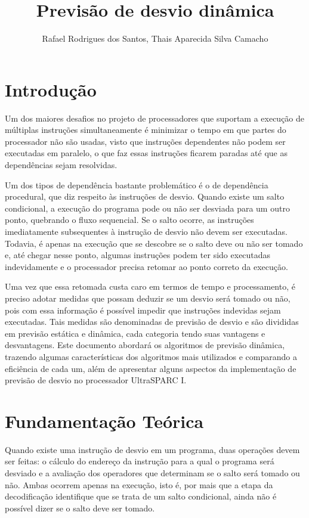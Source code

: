 \documentclass[12pt]{article}
\title{Previsão de desvio dinâmica}
\author{Rafael Rodrigues dos Santos\inst{1}, Thais Aparecida Silva Camacho\inst{1}}
\begin{document}
\maketitle

\section{Introdução}

Um dos maiores desafios no projeto de processadores que suportam a execução de múltiplas instruções simultaneamente é minimizar o tempo em que partes do
processador não são usadas, visto que instruções dependentes não podem ser executadas em paralelo, o que faz essas instruções ficarem paradas até que as
dependências sejam resolvidas.

Um dos tipos de dependência bastante problemático é o de dependência procedural, que diz respeito às instruções de desvio. Quando existe um salto condicional, a
execução do programa pode ou não ser desviada para um outro ponto, quebrando o fluxo sequencial. Se o salto ocorre, as instruções imediatamente subsequentes à
instrução de desvio não devem ser executadas. Todavia, é apenas na execução que se descobre se o salto deve ou não ser tomado e, até chegar nesse ponto,
algumas instruções podem ter sido executadas indevidamente e o processador precisa retomar ao ponto correto da execução.

Uma vez que essa retomada custa caro em termos de tempo e processamento, é preciso adotar medidas que possam deduzir se um desvio será tomado ou não, pois com
essa informação é possível impedir que instruções indevidas sejam executadas. Tais medidas são denominadas de previsão de desvio e são divididas em previsão
estática e dinâmica, cada categoria tendo suas vantagens e desvantagens. Este documento abordará os algoritmos de previsão dinâmica, trazendo algumas características
 dos algoritmos mais utilizados e comparando a eficiência de cada um, além de apresentar alguns aspectos da implementação de previsão de desvio no processador
 UltraSPARC I.

\section{Fundamentação Teórica}

Quando existe uma instrução de desvio em um programa, duas operações devem ser feitas: o cálculo do endereço da instrução para a qual o programa será desviado e
a avaliação dos operadores que determinam se o salto será tomado ou não. Ambas ocorrem apenas na execução, isto é, por mais que a etapa da decodificação
identifique que se trata de um salto condicional, ainda não é possível dizer se o salto deve ser tomado.
\end{document}
